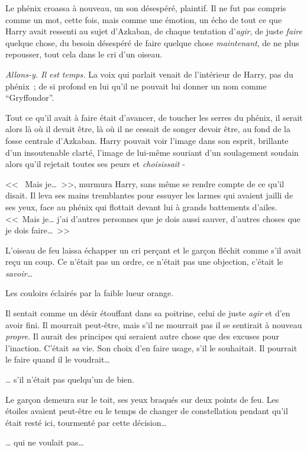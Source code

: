 Le phénix croassa à nouveau, un son désespéré, plaintif. Il ne fut pas compris comme un mot, cette fois, mais comme une émotion, un écho de tout ce que Harry avait ressenti au sujet d'Azkaban, de chaque tentation d'\emph{agir}, de juste \emph{faire} quelque chose, du besoin désespéré de faire quelque chose \emph{maintenant}, de ne plus repousser, tout cela dans le cri d'un oiseau.

\emph{Allons-y. Il est temps.} La voix qui parlait venait de l'intérieur de Harry, pas du phénix~; de si profond en lui qu'il ne pouvait lui donner un nom comme “Gryffondor”.

Tout ce qu'il avait à faire était d'avancer, de toucher les serres du phénix, il serait alors là où il devait être, là où il ne cessait de songer devoir être, au fond de la fosse centrale d'Azkaban. Harry pouvait voir l'image dans son esprit, brillante d'un insoutenable clarté, l'image de lui-même souriant d'un soulagement soudain alors qu'il rejetait toutes ses peurs et \emph{choisissait} -

<<~ Mais je…~>>, murmura Harry, sans même se rendre compte de ce qu'il disait. Il leva ses mains tremblantes pour essuyer les larmes qui avaient jailli de ses yeux, face au phénix qui flottait devant lui à grands battements d'ailes. <<~Mais je… j'ai d'autres personnes que je dois aussi sauver, d'autres choses que je dois faire…~>>

L'oiseau de feu laissa échapper un cri perçant et le garçon fléchit comme s'il avait reçu un coup. Ce n'était pas un ordre, ce n'était pas une objection, c'était le \emph{savoir}…

Les couloirs éclairés par la faible lueur orange.

Il sentait comme un désir étouffant dans sa poitrine, celui de juste \emph{agir} et d'en avoir fini. Il mourrait peut-être, mais s'il ne mourrait pas il se sentirait à nouveau \emph{propre}. Il aurait des principes qui seraient autre chose que des excuses pour l'inaction. C'était \emph{sa} vie. Son choix d'en faire usage, s'il le souhaitait. Il pourrait le faire quand il le voudrait…

… s'il n'était pas quelqu'un de bien.

\later

Le garçon demeura sur le toit, ses yeux braqués sur deux points de feu. Les étoiles avaient peut-être eu le temps de changer de constellation pendant qu'il était resté ici, tourmenté par cette décision…

… qui ne voulait pas…

